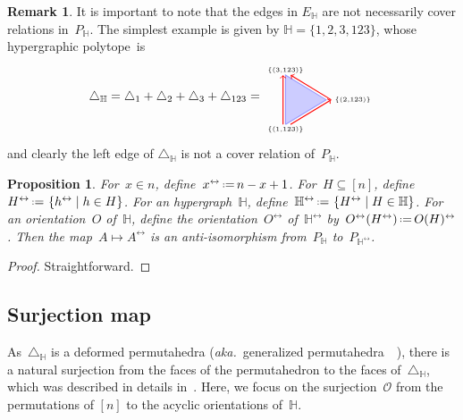 \documentclass[reqno]{amsart}
\newtheorem{proposition}[theorem]{Proposition}
\theoremstyle{definition}
\newtheorem{remark}[theorem]{Remark}
\newcommand{\set}[2]{\left\{ #1 \;\middle|\; #2 \right\}} %
\newcommand{\eqdef}{\mbox{\,\raisebox{0.2ex}{\scriptsize\ensuremath{\mathrm:}}\ensuremath{=}\,}} %
\newcommand{\simplex}{\triangle} %
\newcommand{\aka}{\textit{aka.}~} %
\newcommand{\Or}{\mathcal O}  %
\newcommand{\HH}{\mathbb H}  %
\begin{document}
\begin{remark}
\label{rem:edgeNotCover}
It is important to note that the edges in $E_\HH$ are not necessarily cover relations in~$P_\HH$.
The simplest example is given by
$\HH=\{ 1, 2, 3, 123 \}$, 
whose hypergraphic polytope~is
\[
	\simplex_\HH = \simplex_1 + \simplex_2 + \simplex_3 + \simplex_{123} =
	\begin{tikzpicture}[scale=.7,baseline=.0cm]
		\node (a) at (0,-1.2) {$\scriptscriptstyle \{(1, 123)\}$};
		\node (b) at (2.7,0) {$\scriptscriptstyle \{(2, 123)\}$};
		\node (c) at (0,1.2) {$\scriptscriptstyle \{(3, 123)\}$};
		\draw [color=blue!40,thick,fill=blue!20] (0,-1)--(0,1)--(1.632,0)--(0,-1) ; 
		\draw [color=red,thick,->] (-.1,-1)--(-.1,1); 
		\draw [color=red,thick,->] (1.832,0)--(.2,1); 
		\draw [color=red,thick,->] (.2,-1)--(1.832,0); 
	\end{tikzpicture}
\]
and clearly the left edge of $\simplex_\HH$ is not a cover relation of~$P_\HH$.
\end{remark}

\begin{proposition}
\label{prop:antiIsomorphism}
For~$x \in n$, define~$x^\leftrightarrow \eqdef n-x+1$.
For~$H \subseteq [n]$, define~$H^\leftrightarrow \eqdef \set{h^\leftrightarrow}{h \in H}$.
For an hypergraph~$\HH$, define~$\HH^\leftrightarrow \eqdef \set{H^\leftrightarrow}{H \in \HH}$.
For an orientation~$O$ of~$\HH$, define the orientation~$O^\leftrightarrow$ of~$\HH^\leftrightarrow$ by~$O^\leftrightarrow(H^\leftrightarrow) \eqdef O(H)^\leftrightarrow$.
Then the map~$A \mapsto A^\leftrightarrow$ is an anti-isomorphism from~$P_\HH$ to~$P_{\HH^\leftrightarrow}$.
\end{proposition}

\begin{proof}
Straightforward.
\end{proof}


\subsection{Surjection map} 
\label{subsec:surjection}

As~$\simplex_\HH$ is a deformed permutahedra (\aka generalized permutahedra~~\cite{Postnikov, PostnikovReinerWilliams}), there is a natural surjection from the faces of the permutahedron to the faces of~$\simplex_\HH$, which was described in details in~\cite[Lem.~2.9]{BenedettiBergeronMachacek}.
Here, we focus on the surjection~$\Or$ from the permutations of $[n]$ to the acyclic orientations of~$\HH$.
\end{document}
